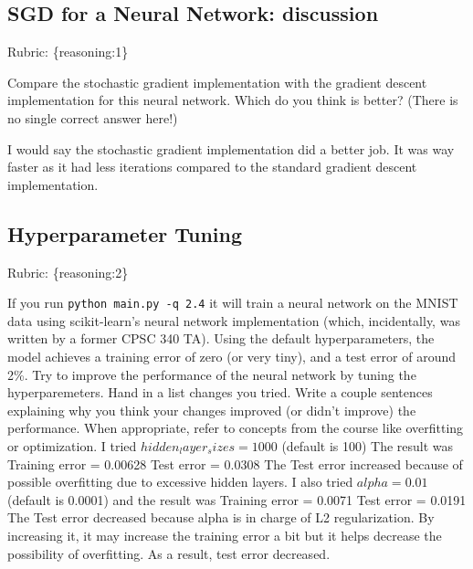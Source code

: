 \documentclass{article}
\def\rubric#1{\gre{Rubric: \{#1\}}}{}
\def\blu#1{{\color{blu}#1}}
\def\gre#1{{\color{gre}#1}}
\def\red#1{{\color{red}#1}}
\begin{document}
\subsection{SGD for a Neural Network: discussion}
\rubric{reasoning:1}

Compare the stochastic gradient implementation with the gradient descent implementation for this neural network. Which do you think is better? (There is no single correct answer here!) 

\red{I would say the stochastic gradient implementation did a better job. It was way faster as it had less iterations compared to the standard gradient descent implementation.}

\subsection{Hyperparameter Tuning}
\rubric{reasoning:2}

If you run \texttt{python main.py -q 2.4} it will train a neural network on the MNIST data using scikit-learn's neural network implementation (which, incidentally, was written by a former CPSC 340 TA).
Using the default hyperparameters, the model achieves a training error of zero (or very tiny), and a test error of around 2\%. 
Try to improve the performance of the neural network by tuning the hyperparemeters.
\blu{Hand in a list changes you tried. Write a couple sentences explaining why you think your changes improved (or didn't improve) the performance. When appropriate, refer to concepts from the course like overfitting or optimization.}
\red{
I tried $hidden_layer_sizes = 1000$ (default is 100)\newline
The result was \newline
Training error =  0.00628
Test error     =  0.0308 \newline
The Test error increased because of possible overfitting due to excessive hidden layers.\newline\newline
I also tried $alpha = 0.01$ (default is 0.0001) and the result was \newline
Training error =  0.0071 \newline
Test error     =  0.0191 \newline
The Test error decreased because alpha is in charge of L2 regularization. By increasing it, it may increase the training error a bit but it helps decrease the possibility of overfitting. As a result, test error decreased.
}
\end{document}
